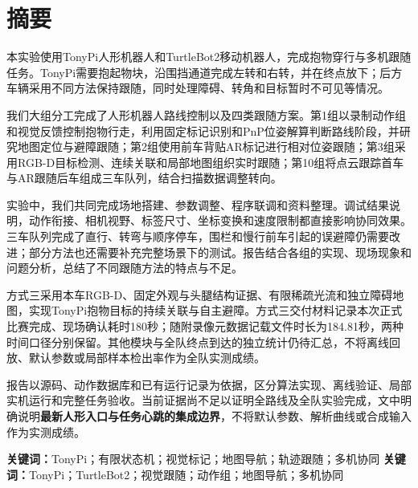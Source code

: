 \section*{摘要}
本实验使用TonyPi人形机器人和TurtleBot2移动机器人，完成抱物穿行与多机跟随任务。TonyPi需要抱起物块，沿围挡通道完成左转和右转，并在终点放下；后方车辆采用不同方法保持跟随，同时处理障碍、转角和目标暂时不可见等情况。

我们大组分工完成了人形机器人路线控制以及四类跟随方案。第1组以录制动作组和视觉反馈控制抱物行走，利用固定标记识别和PnP位姿解算判断路线阶段，并研究地图定位与避障跟随；第2组使用前车背贴AR标记进行相对位姿跟随；第3组采用RGB-D目标检测、连续关联和局部地图组织实时跟随；第10组将点云跟踪首车与AR跟随后车组成三车队列，结合扫描数据调整转向。

实验中，我们共同完成场地搭建、参数调整、程序联调和资料整理。调试结果说明，动作衔接、相机视野、标签尺寸、坐标变换和速度限制都直接影响协同效果。三车队列完成了直行、转弯与顺序停车，围栏和慢行前车引起的误避障仍需要改进；部分方法也还需要补充完整场景下的测试。报告结合各组的实现、现场现象和问题分析，总结了不同跟随方法的特点与不足。

方式三采用本车RGB-D、固定外观与头腿结构证据、有限稀疏光流和独立障碍地图，实现TonyPi抱物目标的持续关联与自主避障。方式三交付材料记录本次正式比赛完成、现场确认耗时180秒；随附录像元数据记载文件时长为184.81秒，两种时间口径分别保留。其他模块与全队终点到达的独立统计仍待汇总，不将离线回放、默认参数或局部样本检出率作为全队实测成绩。

报告以源码、动作数据库和已有运行记录为依据，区分算法实现、离线验证、局部实机运行和完整任务验收。当前证据尚不足以证明全路线及全队实验完成，文中明确说明\textbf{最新人形入口与任务心跳的集成边界}，不将默认参数、解析曲线或合成输入作为实测成绩。

\noindent\textbf{关键词：}TonyPi；有限状态机；视觉标记；地图导航；轨迹跟随；多机协同
\noindent\textbf{关键词：}TonyPi；TurtleBot2；视觉跟随；动作组；地图导航；多机协同
